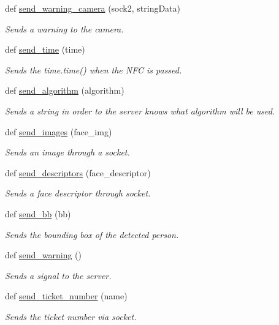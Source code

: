 \begin{DoxyCompactItemize}
\item 
def \hyperlink{namespacesend__socket_ad4bc077f01490938dd5a920dc70619fc}{send\+\_\+warning\+\_\+camera} (sock2, string\+Data)
\begin{DoxyCompactList}\small\item\em Sends a warning to the camera. \end{DoxyCompactList}\item 
def \hyperlink{namespacesend__socket_a5197b7437226d6b7b0e578606700d242}{send\+\_\+time} (time)
\begin{DoxyCompactList}\small\item\em Sends the time.\+time() when the N\+FC is passed. \end{DoxyCompactList}\item 
def \hyperlink{namespacesend__socket_a57f35e628f63e4ef070215be55ae595a}{send\+\_\+algorithm} (algorithm)
\begin{DoxyCompactList}\small\item\em Sends a string in order to the server knows what algorithm will be used. \end{DoxyCompactList}\item 
def \hyperlink{namespacesend__socket_ac07108d7f6f282e7fe5b11e51e516fe4}{send\+\_\+images} (face\+\_\+img)
\begin{DoxyCompactList}\small\item\em Sends an image through a socket. \end{DoxyCompactList}\item 
def \hyperlink{namespacesend__socket_af448703d758a1f3d85c9ab7899500497}{send\+\_\+descriptors} (face\+\_\+descriptor)
\begin{DoxyCompactList}\small\item\em Sends a face descriptor through socket. \end{DoxyCompactList}\item 
def \hyperlink{namespacesend__socket_ab7791e76855c1dd12b0294839104c499}{send\+\_\+bb} (bb)
\begin{DoxyCompactList}\small\item\em Sends the bounding box of the detected person. \end{DoxyCompactList}\item 
def \hyperlink{namespacesend__socket_a88f6a814dc21b08968ded8a0b808b64a}{send\+\_\+warning} ()\hypertarget{namespacesend__socket_a88f6a814dc21b08968ded8a0b808b64a}{}\label{namespacesend__socket_a88f6a814dc21b08968ded8a0b808b64a}

\begin{DoxyCompactList}\small\item\em Sends a signal to the server. \end{DoxyCompactList}\item 
def \hyperlink{namespacesend__socket_a9faa3be75f1108c4f3f5c3517e7f1bb6}{send\+\_\+ticket\+\_\+number} (name)
\begin{DoxyCompactList}\small\item\em Sends the ticket number via socket. \end{DoxyCompactList}\end{DoxyCompactItemize}
